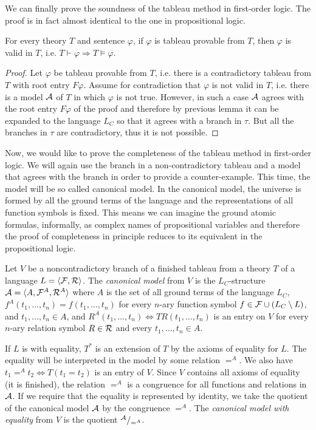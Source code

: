 We can finally prove the soundness of the tableau method in first-order logic. The proof is in fact almost identical to the one in propositional logic. 

\begin{theorem}
For every theory $T$ and sentence $\varphi$, if $\varphi$ is tableau provable from $T$, then $\varphi$ is valid in $T$, i.e. $T \vdash \varphi \Rightarrow T \vDash \varphi$. 
\end{theorem}
\begin{proof}
Let $\varphi$ be tableau provable from $T$, i.e. there is a contradictory tableau from $T$ with root entry $F \varphi$. Assume for contradiction that $\varphi$ is not valid in $T$, i.e. there is a model $\mathcal{A}$ of $T$ in which $\varphi$ is not true. However, in such a case $\mathcal{A}$ agrees with the root entry $F \varphi$ of the proof and therefore by previous lemma it can be expanded to the language $L_C$ so that it agrees with a branch in $\tau$. But all the branches in $\tau$ are contradictory, thus it is not possible.
\end{proof}

Now, we would like to prove the completeness of the tableau method in first-order logic. We will again use the branch in a non-contradictory tableau and a model that agrees with the branch in order to provide a counter-example. This time, the model will be so called canonical model. In the canonical model, the universe is formed by all the ground terms of the language and the representations of all function symbols is fixed. This means we can imagine the ground atomic formulas, informally, as complex names of propositional variables and therefore the proof of completeness in principle reduces to its equivalent in the propositional logic.

Let $V$ be a noncontradictory branch of a finished tableau from a theory $T$ of a language $L = \langle \mathcal{F}, \mathcal{R} \rangle$. The \emph{canonical model} from $V$ is the $L_C$-structure $\mathcal{A} = \langle A, \mathcal{F}^A, \mathcal{R}^A \rangle$ where $A$ is the set of all ground terms of the language $L_C$, $f^A(t_1, \dots, t_n) = f(t_1, \dots, t_n)$ for every $n$-ary function symbol $f \in \mathcal{F} \cup (L_C \setminus L)$, and $t_1, \dots, t_n \in A$, and $R^A(t_1, \dots, t_n) \Leftrightarrow TR(t_1, \dots, t_n)$ is an entry on $V$ for every $n$-ary relation symbol $R \in \mathcal{R}$ and every $t_1, \dots, t_n \in A$.

If $L$ is with equality, $T^*$ is an extension of $T$ by the axioms of equality for $L$. The equality will be interpreted in the model by some relation $=^A$. We also have $t_1 =^A t_2 \Leftrightarrow T(t_1 = t_2)$ is an entry of $V$. Since $V$ contains all axioms of equality (it is finished), the relation $=^A$ is a congruence for all functions and relations in $\mathcal{A}$. If we require that the equality is represented by identity, we take the quotient of the canonical model $\mathcal{A}$ by the congruence $=^A$. The \emph{canonical model with equality} from $V$ is the quotient $^{\mathcal{A}}/_{=^A}$. 

